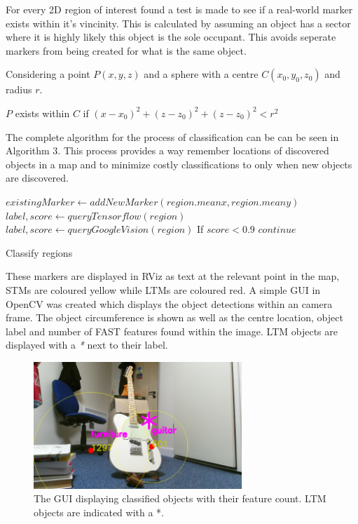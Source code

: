 \documentclass{mproj}
\begin{document}
For every 2D region of interest found a test is made to see if a real-world marker exists within it's vincinity. This is calculated by assuming an object has a sector where it is highly likely this object is the sole occupant. This avoids seperate markers from being created for what is the same object. 

\begin{tcolorbox}
Considering a point $P (x, y, z)$  and a sphere with a centre $ C (x_{0}, y_{0}, z_{0}) $ and radius $r$. 


$P$ exists within $C$ if $(x-x_{0})^{2} +  (z-z_{0})^{2} + (z-z_{0})^{2} <r^2$

\end{tcolorbox}


The complete algorithm for the process of classification can be can be seen in Algorithm 3. This process provides a way remember locations of discovered objects in a map and to minimize costly classifications to only when new objects are discovered. 


\begin{algorithm}

    {
    {
    	$existingMarker \leftarrow addNewMarker(region.meanx, region.meany)$\;
    	{
    	$ label, score \leftarrow queryTensorflow(region)$\;
    		{
    		$ label, score \leftarrow queryGoogleVision(region)$\;
    		If {$score < 0.9$} 
    		{
    		$continue$\;
    		}
    		}	
    	}	
    }
    }
	

    
    \caption{Classify regions}
\end{algorithm}


These markers are displayed in RViz as text at the relevant point in the map, STMs are coloured yellow while LTMs are coloured red. A simple GUI in OpenCV was created which displays the object detections within an camera frame. The object circumference is shown as well as the centre location, object label and number of FAST features found within the image. LTM objects are displayed with a \textit{*} next to their label.

\begin{figure}
   \caption{The GUI displaying classified objects with their feature count. LTM objects are indicated with a *.}
   \centering
   \includegraphics[width=0.7\textwidth]{images/gui.png}
   
\end{figure}
\end{document}
